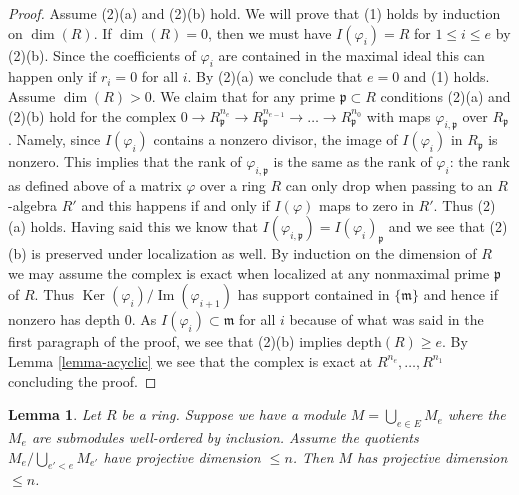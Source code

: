 \documentclass{amsart}
\theoremstyle{plain}
\newtheorem{lemma}[subsection]{Lemma}
\theoremstyle{definition}
\theoremstyle{remark}
\numberwithin{equation}{subsection}
\def\Ker{\mathop{\mathrm{Ker}}}
\def\Im{\mathop{\mathrm{Im}}}
\begin{document}
\begin{proof}
\medskip\noindent
Assume (2)(a) and (2)(b) hold. We will prove that (1) holds by
induction on $\dim(R)$. If $\dim(R) = 0$, then we must have
$I(\varphi_i) = R$ for $1 \leq i \leq e$ by (2)(b). Since the
coefficients of $\varphi_i$ are contained in the maximal ideal
this can happen only if $r_i = 0$ for all $i$. By (2)(a) we
conclude that $e = 0$ and (1) holds. Assume $\dim(R) > 0$.
We claim that for any prime $\mathfrak p \subset R$ conditions
(2)(a) and (2)(b) hold for the complex
$0 \to R_\mathfrak p^{n_e} \to R_\mathfrak p^{n_{e - 1}} \to \ldots \to
R_\mathfrak p^{n_0}$ with maps $\varphi_{i, \mathfrak p}$
over $R_\mathfrak p$. Namely, since $I(\varphi_i)$ contains a
nonzero divisor, the image of $I(\varphi_i)$ in $R_\mathfrak p$
is nonzero. This implies that the rank of $\varphi_{i, \mathfrak p}$
is the same as the rank of $\varphi_i$: the rank as defined above
of a matrix $\varphi$ over a ring $R$ can only drop when passing
to an $R$-algebra $R'$ and this happens if and only if $I(\varphi)$
maps to zero in $R'$. Thus (2)(a) holds. Having said this
we know that $I(\varphi_{i, \mathfrak p}) = I(\varphi_i)_\mathfrak p$
and we see that (2)(b) is preserved under localization as well.
By induction on the dimension of $R$ we may assume the complex
is exact when localized at any nonmaximal prime $\mathfrak p$ of $R$.
Thus $\Ker(\varphi_i)/\Im(\varphi_{i + 1})$ has support contained in
$\{\mathfrak m\}$ and hence if nonzero has depth $0$.
As $I(\varphi_i) \subset \mathfrak m$ for all $i$ because
of what was said in the first paragraph of the proof, we
see that (2)(b) implies $\text{depth}(R) \geq e$.
By Lemma \ref{lemma-acyclic} we see
that the complex is exact at $R^{n_e}, \ldots, R^{n_1}$
concluding the proof.
\end{proof}


\begin{lemma}
\label{lemma-colimit-projective-dimension}
Let $R$ be a ring. Suppose we have a module $M = \bigcup_{e \in E} M_e$
where the $M_e$ are submodules well-ordered by inclusion. Assume the quotients
$M_e/\bigcup\nolimits_{e' < e} M_{e'}$ have projective dimension $\leq n$.
Then $M$ has projective dimension $\leq n$.
\end{lemma}
\end{document}
